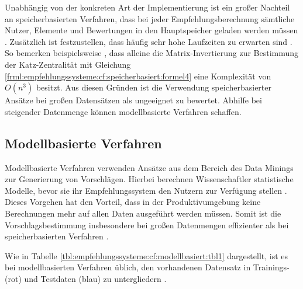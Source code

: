 Unabhängig von der konkreten Art der Implementierung ist ein großer Nachteil an speicherbasierten Verfahren, dass bei jeder Empfehlungsberechnung sämtliche Nutzer, Elemente und Bewertungen in den Hauptspeicher geladen werden müssen \cite[S. 8]{yang:2016}. Zusätzlich ist festzustellen, dass häufig sehr hohe Laufzeiten zu erwarten sind \cite[S. 2]{zhang:2010}. So bemerken beispielsweise \textcite[S. 3]{landherr:2010}, dass alleine die Matrix-Invertierung zur Bestimmung der Katz-Zentralität mit Gleichung \ref{frml:empfehlungssysteme:cf:speicherbasiert:formel4} eine Komplexität von $O(n^3)$ besitzt. Aus diesen Gründen ist die Verwendung speicherbasierter Ansätze bei großen Datensätzen als ungeeignet zu bewertet. Abhilfe bei steigender Datenmenge können modellbasierte Verfahren schaffen.

\subsection{Modellbasierte Verfahren}
\label{ch:empfehlungssysteme:cf:modellbasiert}
Modellbasierte Verfahren verwenden Ansätze aus dem Bereich des Data Minings zur Generierung von Vorschlägen. Hierbei berechnen Wissenschaftler statistische Modelle, bevor sie ihr Empfehlungssystem den Nutzern zur Verfügung stellen \cite[S. 2]{cui:2020}. Dieses Vorgehen hat den Vorteil, dass in der Produktivumgebung keine Berechnungen mehr auf allen Daten ausgeführt werden müssen. Somit ist die Vorschlagsbestimmung insbesondere bei großen Datenmengen effizienter als bei speicherbasierten Verfahren \cite[S. 8]{yang:2016}.

Wie in Tabelle \ref{tbl:empfehlungssysteme:cf:modellbasiert:tbl1} dargestellt, ist es bei modellbasierten Verfahren üblich, den vorhandenen Datensatz in Trainings- (rot) und Testdaten (blau) zu untergliedern \cite[S. 71f.]{recommenderSystems:2016}. %

